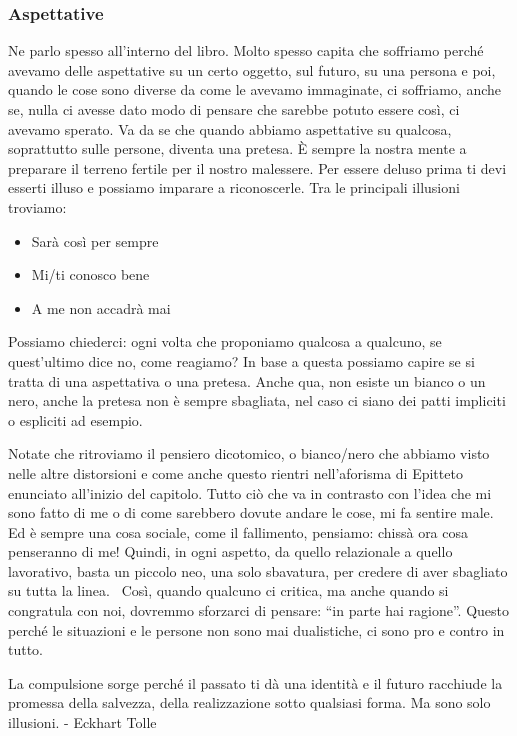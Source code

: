 \documentclass[12pt]{book} %
\begin{document}
\subsubsection{Aspettative}
Ne parlo spesso all'interno del libro. Molto spesso capita che soffriamo perché avevamo delle
aspettative su un certo oggetto, sul futuro, su una persona e poi, quando le cose sono diverse da come le avevamo
immaginate, ci soffriamo, anche se, nulla ci avesse dato modo di pensare che sarebbe potuto essere così, ci avevamo
sperato. Va da se che quando abbiamo aspettative su qualcosa, soprattutto sulle persone, diventa una pretesa. È sempre
la nostra mente a preparare il terreno fertile per il nostro malessere. Per essere deluso prima ti devi esserti illuso
e possiamo imparare a riconoscerle. Tra le principali illusioni troviamo:

\begin{itemize}
\item Sarà così per sempre
\item Mi/ti conosco bene
\item A me non accadrà mai
\end{itemize}
Possiamo chiederci: ogni volta che proponiamo qualcosa a qualcuno, se quest'ultimo dice no, come reagiamo? In base a
questa possiamo capire se si tratta di una aspettativa o una pretesa. Anche qua, non esiste un bianco o un nero, anche
la pretesa non è sempre sbagliata, nel caso ci siano dei patti impliciti o espliciti ad esempio.

Notate che ritroviamo il pensiero dicotomico, o bianco/nero che abbiamo visto nelle altre distorsioni e come anche
questo rientri nell'aforisma di Epitteto enunciato all'inizio del capitolo.
Tutto ciò che va in contrasto con l'idea che mi sono fatto di me o di come sarebbero dovute andare le cose, mi fa
sentire male. Ed è sempre una cosa sociale, come il fallimento, pensiamo: chissà ora cosa penseranno di me! Quindi, in
ogni aspetto, da quello relazionale a quello lavorativo, basta un piccolo neo, una solo sbavatura, per credere di aver
sbagliato su tutta la linea. \ Così, quando qualcuno ci critica, ma anche quando si congratula con noi, dovremmo
sforzarci di pensare: “in parte hai ragione”. Questo perché le situazioni e le persone non sono mai dualistiche, ci
sono pro e contro in tutto. 

{\textquotedbl}La compulsione sorge perché il passato ti dà una identità e il futuro racchiude la promessa della
salvezza, della realizzazione sotto qualsiasi forma. Ma sono solo illusioni.{\textquotedbl} - Eckhart Tolle
\end{document}
